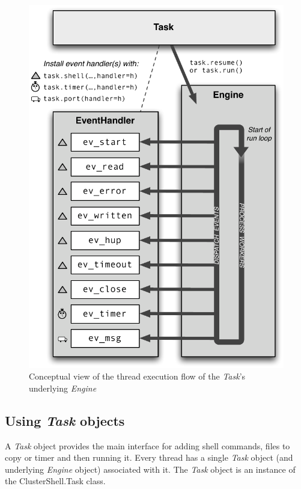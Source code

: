 \documentclass[english,a4paper]{csuserguide}
\newcommand{\Task}{\textit{Task}\xspace}
\newcommand{\Engine}{\textit{Engine}\xspace}
\begin{document}
\begin{figure}[!ht]
\begin{center}
\includegraphics[scale=0.80]{TaskEvents}
\caption{Conceptual view of the thread execution flow of the \Task's underlying \Engine}
\label{TaskEvents}
\end{center}
\end{figure}


\subsection{Using \Task objects}

A \Task object provides the main interface for adding shell commands, files to copy or timer and then running it. Every thread has a single \Task object (and underlying \Engine object) associated with it. The \Task object is an instance of the ClusterShell.Task class.
\end{document}
